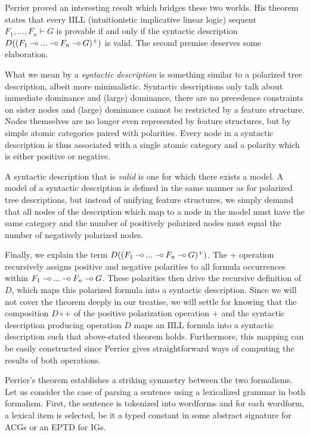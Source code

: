 Perrier \cite{perrier1999intuitionistic} proved an interesting result
which bridges these two worlds. His theorem states that every IILL
(intuitionistic implicative linear logic) sequent $F_1, ..., F_n \vdash
G$ is provable if and only if the syntactic description $D((F_1 \mathbin{{-}\mkern-3.5mu{\circ}}
... \mathbin{{-}\mkern-3.5mu{\circ}} F_n \mathbin{{-}\mkern-3.5mu{\circ}} G)^+)$ is valid. The second premise deserves some
elaboration.

What we mean by a \emph{syntactic description} is something similar to a
polarized tree description, albeit more minimalistic. Syntactic
descriptions only talk about immediate dominance and (large) dominance,
there are no precedence constraints on sister nodes and (large)
dominance cannot be restricted by a feature structure. Nodes themselves
are no longer even represented by feature structures, but by simple
atomic categories paired with polarities. Every node in a syntactic
description is thus associated with a single atomic category and a
polarity which is either positive or negative.

A syntactic description that is \emph{valid} is one for which there
exists a model. A model of a syntactic description is defined in the
same manner as for polarized tree descriptions, but instead of unifying
feature structures, we simply demand that all nodes of the description
which map to a node in the model must have the same category and the
number of positively polarized nodes must equal the number of negatively
polarized nodes.

Finally, we explain the term $D((F_1 \mathbin{{-}\mkern-3.5mu{\circ}} ... \mathbin{{-}\mkern-3.5mu{\circ}} F_n \mathbin{{-}\mkern-3.5mu{\circ}}
G)^+)$. The $+$ operation recursively assigns positive and negative
polarities to all formula occurrences within $F_1 \mathbin{{-}\mkern-3.5mu{\circ}} ... \mathbin{{-}\mkern-3.5mu{\circ}} F_n
\mathbin{{-}\mkern-3.5mu{\circ}} G$. These polarities then drive the recursive definition of $D$,
which maps this polarized formula into a syntactic description. Since we
will not cover the theorem deeply in our treatise, we will settle for
knowing that the composition $D \circ +$ of the positive polarization
operation $+$ and the syntactic description producing operation $D$ maps
an IILL formula into a syntactic description such that above-stated
theorem holds. Furthermore, this mapping can be easily constructed since
Perrier gives straightforward ways of computing the results of both
operations.

Perrier's theorem establishes a striking symmetry between the two
formalisms. Let us consider the case of parsing a sentence using a
lexicalized grammar in both formalism. First, the sentence is tokenized
into wordforms and for each wordform, a lexical item is selected, be it
a typed constant in some abstract signature for ACGs or an EPTD for IGs.


